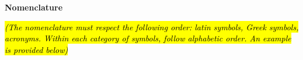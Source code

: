 \documentclass[12pt,letterpaper]{article}
\newcommand{\placeholder}[1]{\hl{#1}}
\newcommand{\reportheading}[1]{\begin{center}\textbf{#1}\end{center}}
\begin{document}
\clearpage

\listoffigures

\clearpage

\listoftables

\clearpage

\vspace*{0.30in}
\reportheading{Nomenclature}

\vspace{0.22in}

\placeholder{\textit{(The nomenclature must respect the following order: latin symbols, Greek symbols, acronyms. Within each category of symbols, follow alphabetic order. An example is provided below)}}\par

\vspace{0.20in}
\end{document}
